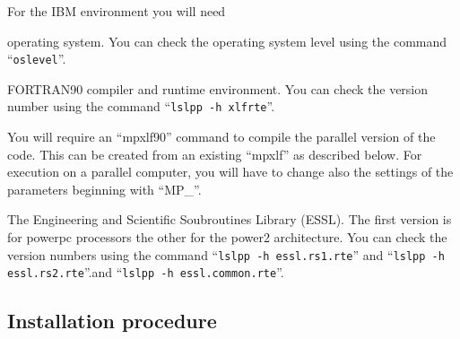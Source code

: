 \documentclass[final,12pt]{article}
\begin{document}
For the IBM environment you will need
\begin{description}
\item[AIX] operating system. You can check the operating system level
  using the command  ``{\tt oslevel}''.
\item[XLF90] FORTRAN90 compiler and runtime environment. You can check
  the version number using the command ``{\tt lslpp -h xlfrte}''.
\item You will require an ``mpxlf90'' command to compile the parallel
  version of the code.  This can be created from an existing ``mpxlf''
  as described below.  For execution on a parallel computer, you will
  have to change also the settings of the parameters beginning with
  ``MP\_''.
\item[libessl.a,libesslp2.a]
\begin{sloppypar} 
 The Engineering and Scientific
  Soubroutines Library (ESSL)\cite{ESSL}. The first version is for powerpc
  processors the other for the power2 architecture. You can check the
  version numbers using the command ``{\tt lslpp -h essl.rs1.rte}''
  and ``{\tt lslpp -h essl.rs2.rte}''.and ``{\tt lslpp -h essl.common.rte}''.
\end{sloppypar}
\end{description}
%
\subsection{Installation procedure}
\end{document}
